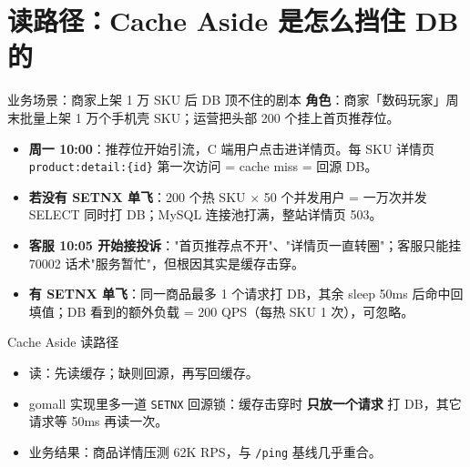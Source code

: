 \documentclass[aspectratio=169,11pt]{beamer}
\begin{document}
\section{读路径：Cache Aside 是怎么挡住 DB 的}

\begin{frame}[shrink]{业务场景：商家上架 1 万 SKU 后 DB 顶不住的剧本}
\textbf{角色}：商家「数码玩家」周末批量上架 1 万个手机壳 SKU；运营把头部 200 个挂上首页推荐位。
\vspace{1mm}
\begin{itemize}
  \item \textbf{周一 10:00}：推荐位开始引流，C 端用户点击进详情页。每 SKU 详情页 \texttt{product:detail:\{id\}} 第一次访问 = cache miss = 回源 DB。
  \item \textbf{若没有 SETNX 单飞}：200 个热 SKU $\times$ 50 个并发用户 = 一万次并发 SELECT 同时打 DB；MySQL 连接池打满，整站详情页 503。
  \item \textbf{客服 10:05 开始接投诉}："首页推荐点不开"、"详情页一直转圈"；客服只能挂 70002 话术"服务暂忙"，但根因其实是缓存击穿。
  \item \textbf{有 SETNX 单飞}：同一商品最多 1 个请求打 DB，其余 sleep 50ms 后命中回填值；DB 看到的额外负载 = 200 QPS（每热 SKU 1 次），可忽略。
\end{itemize}
\end{frame}

\begin{frame}[shrink]{Cache Aside 读路径}
\vspace{1mm}
\begin{itemize}
  \item 读：先读缓存；缺则回源，再写回缓存。
  \item gomall 实现里多一道 \texttt{SETNX} 回源锁：缓存击穿时 \textbf{只放一个请求} 打 DB，其它请求等 50ms 再读一次。
  \item 业务结果：商品详情压测 62K RPS，与 \texttt{/ping} 基线几乎重合。
\end{itemize}
\end{frame}
\end{document}
